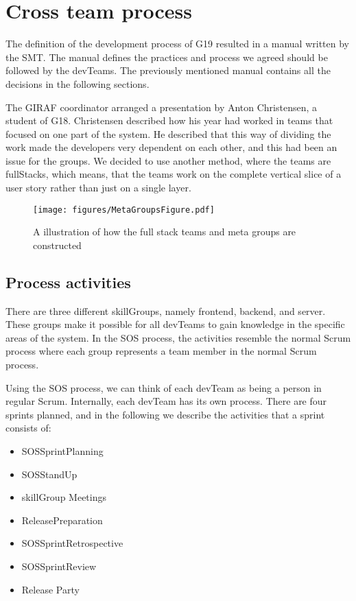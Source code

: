 \section{Cross team process}
The definition of the development process of \gls{G19} resulted in a manual\cite{processManual} written by the \gls{SMT}. The manual defines the practices and process we agreed should be followed by the \glspl{devTeam}. The previously mentioned manual contains all the decisions in the following sections.

The GIRAF coordinator arranged a presentation by Anton Christensen, a student of \gls{G18}. Christensen described how his year had worked in teams that focused on one part of the system. He described that this way of dividing the work made the developers very dependent on each other, and this had been an issue for the groups. We decided to use another method, where the teams are \Glspl{fullStack}, which means, that the teams work on the complete vertical slice of a user story rather than just on a single layer.
\begin{figure}[H]
        \begin{center}
            \texttt{[image: figures/MetaGroupsFigure.pdf]}
        \end{center}
        \caption{A illustration of how the full stack teams and meta groups are constructed}
        \label{fig:MetaGroupsFigure}
\end{figure}
\subsection{Process activities}
There are three different \glspl{skillGroup}, namely frontend, backend, and server. These groups make it possible for all \glspl{devTeam} to gain knowledge in the specific areas of the system. In the \gls{SOS} process, the activities resemble the normal Scrum process where each group represents a team member in the normal Scrum process.

Using the \gls{SOS} process, we can think of each \gls{devTeam} as being a person in regular Scrum. Internally, each \gls{devTeam} has its own process. There are four sprints planned, and in the following we describe the activities that a sprint consists of:

\begin{itemize}
    \item \Gls{SOSSprintPlanning}
    \item \Gls{SOSStandUp}
    \item \Gls{skillGroup} Meetings
    \item \Gls{ReleasePreparation}
    \item \Gls{SOSSprintRetrospective}
    \item \Gls{SOSSprintReview}
    \item Release Party
\end{itemize}

